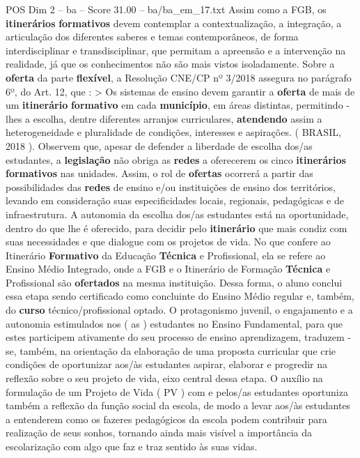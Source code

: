 \begin{textsample}{POS Dim 2 – ba – Score 31.00 – ba/ba\_em\_17.txt}
Assim como a FGB, os \textbf{itinerários} \textbf{formativos} devem contemplar a contextualização, a integração, a articulação dos diferentes saberes e temas contemporâneos, de forma interdisciplinar e transdisciplinar, que permitam a apreensão e a intervenção na realidade, já que os conhecimentos não são mais vistos isoladamente.
Sobre a \textbf{oferta} da parte \textbf{flexível}, a Resolução CNE/CP nº 3/2018 assegura no parágrafo 6º, do Art. 12, que : > Os sistemas de ensino devem garantir a \textbf{oferta} de mais de um \textbf{itinerário} \textbf{formativo} em cada \textbf{município}, em áreas distintas, permitindo -lhes a escolha, dentre diferentes arranjos curriculares, \textbf{atendendo} assim a heterogeneidade e pluralidade de condições, interesses e aspirações. ( BRASIL, 2018 ).
Observem que, apesar de defender a liberdade de escolha dos/as estudantes, a \textbf{legislação} não obriga as \textbf{redes} a oferecerem os cinco \textbf{itinerários} \textbf{formativos} nas unidades.
Assim, o rol de \textbf{ofertas} ocorrerá a partir das possibilidades das \textbf{redes} de ensino e/ou instituições de ensino dos territórios, levando em consideração suas especificidades locais, regionais, pedagógicas e de infraestrutura.
A autonomia da escolha dos/as estudantes está na oportunidade, dentro do que lhe é oferecido, para decidir pelo \textbf{itinerário} que mais condiz com suas necessidades e que dialogue com os projetos de vida.
No que confere ao Itinerário \textbf{Formativo} da Educação \textbf{Técnica} e Profissional, ela se refere ao Ensino Médio Integrado, onde a FGB e o Itinerário de Formação \textbf{Técnica} e Profissional são \textbf{ofertados} na mesma instituição.
Dessa forma, o aluno conclui essa etapa sendo certificado como concluinte do Ensino Médio regular e, também, do \textbf{curso} técnico/profissional optado.
O protagonismo juvenil, o engajamento e a autonomia estimulados nos ( as ) estudantes no Ensino Fundamental, para que estes participem ativamente do seu processo de ensino aprendizagem, traduzem -se, também, na orientação da elaboração de uma proposta curricular que crie condições de oportunizar aos/às estudantes aspirar, elaborar e progredir na reflexão sobre o seu projeto de vida, eixo central dessa etapa.
O auxílio na formulação de um Projeto de Vida ( PV ) com e pelos/as estudantes oportuniza também a reflexão da função social da escola, de modo a levar aos/às estudantes a entenderem como os fazeres pedagógicos da escola podem contribuir para realização de seus sonhos, tornando ainda mais visível a importância da escolarização com algo que faz e traz sentido às suas vidas.

\end{textsample}

